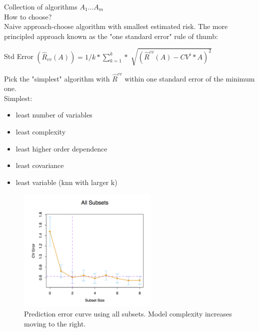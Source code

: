 \documentclass[a4paper]{article}
\begin{document}
Collection of algorithms $A_1...A_m$
\\How to choose?
\\Naive approach-choose algorithm with smallest estimated risk. The more principled approach known as the "one standard error" rule of thumb:
\begin{center}
	Std Error $(\hat{R}_{cv}(A))=1/k*\sum_{k=1}^k*\sqrt[]{(\hat{R}^{cv}(A)-CV^i*A)^2}$
\end{center}
Pick the "simplest" algorithm with $\hat{R}^{cv}$ within one standard error of the minimum one.
\\Simplest: 
\begin{itemize}
  \item least number of variables
  \item least complexity
  \item least higher order dependence
  \item least covariance
  \item least variable (knn with larger k)
\end{itemize}

\begin{figure}[H] 
\centering
\includegraphics[width=0.6\textwidth]{all_subsets.png}
\caption{Prediction error curve using all subsets. Model complexity increases moving to the right.}
\end{figure}
\end{document}
